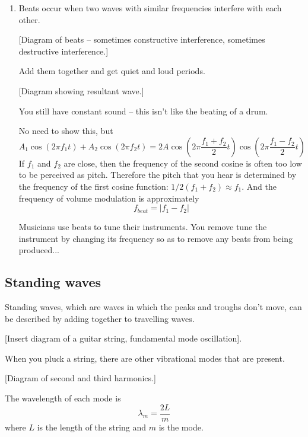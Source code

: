 \begin{enumerate}
\nopagebreak
\vspace{5cm}


\item Beats occur when two waves with similar frequencies interfere with each other.\nopagebreak

[Diagram of beats -- sometimes constructive interference, sometimes destructive interference.]\nopagebreak
\vspace{5cm}

Add them together and get quiet and loud periods.

[Diagram showing resultant wave.]\nopagebreak
\vspace{5cm}

You still have constant sound -- this isn't like the beating of a drum.

No need to show this, but
$$A_1\cos(2\pi f_1 t)+A_2\cos(2\pi f_2 t)=2A\cos\left(2\pi\frac{f_1+f_2}{2}t\right)\cos\left(2\pi\frac{f_1-f_2}{2}t\right)$$
If $f_1$ and $f_2$ are close, then the frequency of the second cosine is often too low to be perceived as pitch. Therefore the pitch that you hear is determined by the frequency of the first cosine function: $1/2(f_1+f_2)\approx f_1$. And the frequency of volume modulation is approximately
$$f_{beat}=|f_1-f_2|$$

Musicians use beats to tune their instruments. You remove tune the instrument by changing its frequency so as to remove any beats from being produced...

\end{enumerate}

\subsection{Standing waves}
Standing waves, which are waves in which the peaks and troughs don't move, can be described by adding together to travelling waves.

[Insert diagram of a guitar string, fundamental mode oscillation].\nopagebreak
\vspace{5cm}

When you pluck a string, there are other vibrational modes that are present.

[Diagram of second and third harmonics.]\nopagebreak
\vspace{5cm}

The wavelength of each mode is
$$\lambda_m=\frac{2L}{m}$$
where $L$ is the length of the string and $m$ is the mode.

